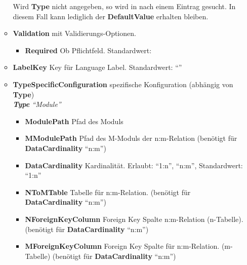 \begin{itemize}
\begin{itemize}
\begin{itemize}
                            \end{itemize}
                            Wird \textbf{Type} nicht angegeben, so wird in  nach einem Eintrag gesucht. In diesem Fall kann lediglich der \textbf{DefaultValue} erhalten bleiben.
                        \item \textbf{Validation}\superscript{*}  mit Validierungs-Optionen.
                            \begin{itemize}
                                \item \textbf{Required}\superscript{*}  Ob Pflichtfeld. Standardwert: 
                            \end{itemize}
                        \item \textbf{LabelKey}\superscript{*}  Key für Language Label. Standardwert: ``''
                        \item \textbf{TypeSpecificConfiguration}\superscript{*}  spezifische Konfiguration (abhängig von \textbf{Type}) \\
                            \-\hspace{2mm}\textit{\textbf{Type} ``Module''}
                            \begin{itemize}
                                \item \textbf{ModulePath}  Pfad des Moduls
                                \item \textbf{MModulePath}\superscript{*}   Pfad des M-Moduls der n:m-Relation (benötigt für \textbf{DataCardinality} ``n:m'')
                                \item \textbf{DataCardinality}\superscript{*}  Kardinalität. Erlaubt: ``1:n'', ``n:m'', Standardwert: ``1:n''
                                \item \textbf{NToMTable}\superscript{*}  Tabelle für n:m-Relation. (benötigt für \textbf{DataCardinality} ``n:m'')
                                \item \textbf{NForeignKeyColumn}\superscript{*}  Foreign Key Spalte n:m-Relation (n-Tabelle). (benötigt für \textbf{DataCardinality} ``n:m'')
                                \item \textbf{MForeignKeyColumn}\superscript{*}  Foreign Key Spalte für n:m-Relation. (m-Tabelle) (benötigt für \textbf{DataCardinality} ``n:m'')

\end{itemize}
\end{itemize}
\end{itemize}
